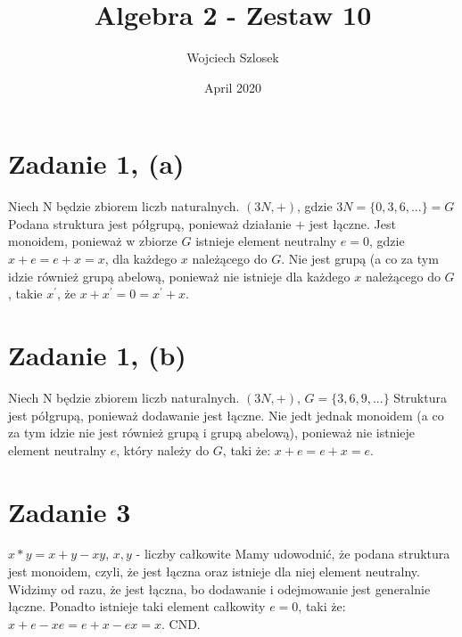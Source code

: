 \documentclass{article}
\title{Algebra 2 - Zestaw 10}
\author{Wojciech Szlosek}
\date{April 2020}
\begin{document}
\maketitle

\section{Zadanie 1, (a)}
Niech N będzie zbiorem liczb naturalnych. \newline
$(3N, +)$, gdzie $3N = \{0,3,6,...\} = G$ \newline \newline
Podana struktura jest półgrupą, ponieważ działanie $+$ jest łączne. \newline 
Jest monoidem, ponieważ w zbiorze $G$ istnieje element neutralny $e = 0$, gdzie $x + e = e+ x = x$, dla każdego $x$ należącego do $G$.\newline
Nie jest grupą (a co za tym idzie również grupą abelową, ponieważ nie istnieje dla każdego $x$ należącego do $G$, takie $x^{'}$, że $x + x^{'} = 0 = x^{'} + x$. \newline

\section{Zadanie 1, (b)}
Niech N będzie zbiorem liczb naturalnych. \newline
$(3N, +)$, $G = \{3, 6, 9,...\}$ \newline \newline
Struktura jest półgrupą, ponieważ dodawanie jest łączne. \newline
Nie jedt jednak monoidem (a co za tym idzie nie jest również grupą i grupą abelową), ponieważ nie istnieje element neutralny $e$, który należy do $G$, taki że: $x+e = e+x = e$.

\section{Zadanie 3}
$x*y = x+y - xy$, $x, y$ - liczby całkowite \newline
Mamy udowodnić, że podana struktura jest monoidem, czyli, że jest łączna oraz istnieje dla niej element neutralny. \newline \newline
Widzimy od razu, że jest łączna, bo dodawanie i odejmowanie jest generalnie łączne. \newline
Ponadto istnieje taki element całkowity $e = 0$, taki że: $x+e-xe=e+x-ex=x$. \newline \newline
CND.
\end{document}
